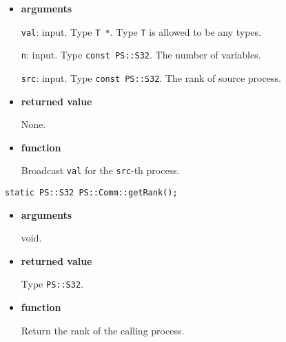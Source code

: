\begin{itemize}

\item{\bf arguments}

{\tt val}: input. Type {\tt T *}. Type {\tt T} is allowed to be any
types.

{\tt n}: input. Type {\tt const PS::S32}. The number of variables.

{\tt src}: input. Type {\tt const PS::S32}. The rank of source
process.


\item{\bf returned value}

None.

\item{\bf function}

Broadcast {\tt val} for the {\tt src}-th process.










\end{itemize}






\begin{screen}
\begin{verbatim}
static PS::S32 PS::Comm::getRank();
\end{verbatim}
\end{screen}

\begin{itemize}

\item{\bf arguments}

void.

\item{\bf returned value}

Type {\tt PS::S32}.

\item{\bf function}

Return the rank of the calling process.

\end{itemize}

